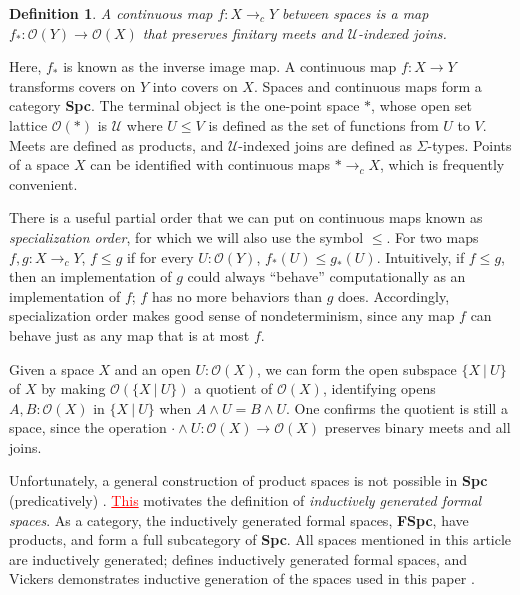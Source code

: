 \documentclass[conference]{IEEEtran}
\newtheorem{definition}{Definition}
\newcommand{\cto}{\to_c}
\newcommand{\Type}{\mathcal{U}}
\newcommand{\suchthat}{\ |\ }
\newcommand{\One}{\ast}
\newcommand{\Open}[1]{\mathcal{O}({#1})}
\newcommand{\comment}[1]{}
\newcommand{\grammar}[1]{\textcolor{red}{\underline{#1}}}
\begin{document}
\begin{definition}
A \emph{continuous map} $f : X \cto Y$ between spaces is a map $f_* : \Open{Y} \to \Open{X}$ that preserves finitary meets and $\Type$-indexed joins.
\end{definition}

Here, $f_*$ is known as the inverse image map. A continuous map $f : X \to Y$ transforms covers on $Y$ into covers on $X$. Spaces and continuous maps form a category \textbf{Spc}. The terminal object is the one-point space $\One$, whose open set lattice $\Open{\One}$ is $\Type$ where $U \le V$ is defined as the set of functions from $U$ to $V$. Meets are defined as products, and $\Type$-indexed joins are defined as $\Sigma$-types. Points of a space $X$ can be identified with continuous maps $\One \cto X$, which is frequently convenient.

There is a useful partial order that we can put on continuous maps known as \emph{specialization order}, for which we will also use the symbol $\le$. For two maps $f, g : X \cto Y$, $f \le g$ if for every $U : \Open{Y}$, $f_*(U) \le g_*(U)$. Intuitively, if $f \le g$, then an implementation of $g$ could always ``behave'' computationally as an implementation of $f$; $f$ has no more behaviors than $g$ does. Accordingly, specialization order makes good sense of nondeterminism, since any map $f$ can behave just as any map that is at most $f$.

Given a space $X$ and an open $U : \Open{X}$, we can form the open subspace $\{ X \suchthat U \}$ of $X$ by making $\Open{\{X \suchthat U \}}$ a quotient of $\Open{X}$, identifying opens $A, B : \Open{X}$ in $\{ X \suchthat U \}$ when $A \wedge U = B \wedge U$. One confirms the quotient is still a space, since the operation $\cdot \wedge U : \Open{X} \to \Open{X}$ preserves binary meets and all joins.

Unfortunately, a general construction of product spaces is not possible in \textbf{Spc} (predicatively) \cite{coquand2003}. \grammar{This} motivates the definition of \emph{inductively generated formal spaces}. As a category, the inductively generated formal spaces, \textbf{FSpc}, have products, and form a full subcategory of \textbf{Spc}. All spaces mentioned in this article are inductively generated; \cite{coquand2003} defines inductively generated formal spaces, and Vickers demonstrates inductive generation of the spaces used in this paper \cite{vickersmetric, vickersdoublepowerlocale, SublocFT}.

\comment{
\begin{definition}
An \emph{inductively generated formal space} is a preorder $S$ together with a function 
\[
C : S \to \Sigma (I : \Type).\ I \to (S \to \Type),
\]
called an \emph{axiom set}.
\end{definition}

The preorder $S$ represents a base for the opens of the space. The construction in \cite{coquand2003} generates the ``free'' space $X$ whose base is $S$, with an inclusion of the base $y : S \to \Open{X}$ that satisfies, for each $s : S$, letting $(I, U) = C(s)$, for any $i : I$, 
\begin{mathpar}
\inferrule*
  {}
  {ya \le \bigvee_{b : U_i} yb}
\end{mathpar}
}
\end{document}
